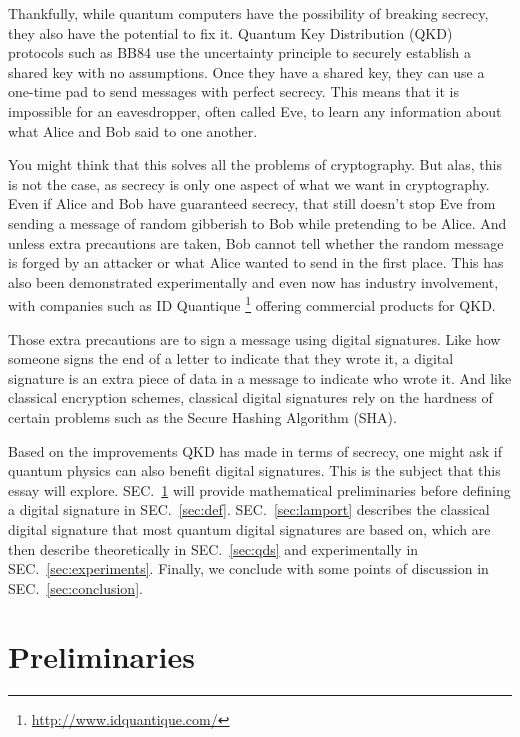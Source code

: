 \documentclass[%
 reprint,
 amsmath,amssymb,
 aps,
 pra,
]{revtex4-1}
\begin{document}
Thankfully, while quantum computers have the possibility of breaking secrecy, they also have the potential to fix it. Quantum Key Distribution (QKD) protocols such as BB84 \citep{BB84} use the uncertainty principle to securely establish a shared key with no assumptions. Once they have a shared key, they can use a one-time pad to send messages with perfect secrecy. This means that it is impossible for an eavesdropper, often called Eve, to learn any information about what Alice and Bob said to one another.

You might think that this solves all the problems of cryptography. But alas, this is not the case, as secrecy is only one aspect of what we want in cryptography. Even if Alice and Bob have guaranteed secrecy, that still doesn't stop Eve from sending a message of random gibberish to Bob while pretending to be Alice. And unless extra precautions are taken, Bob cannot tell whether the random message is forged by an attacker or what Alice wanted to send in the first place. This has also been demonstrated experimentally \cite{Bennett1992} and even now has industry involvement, with companies such as ID Quantique \footnote{\url{http://www.idquantique.com/}} offering commercial products for QKD.

Those extra precautions are to sign a message using digital signatures. Like how someone signs the end of a letter to indicate that they wrote it, a digital signature is an extra piece of data in a message to indicate who wrote it. And like classical encryption schemes, classical digital signatures rely on the hardness of certain problems such as the Secure Hashing Algorithm (SHA).

Based on the improvements QKD has made in terms of secrecy, one might ask if quantum physics can also benefit digital signatures. This is the subject that this essay will explore. SEC.\ \ref{sec:prelim} will provide mathematical preliminaries before defining a digital signature in SEC.\ \ref{sec:def}. SEC.\ \ref{sec:lamport} describes the classical digital signature that most quantum digital signatures are based on, which are then describe theoretically in SEC.\ \ref{sec:qds} and experimentally in SEC.\ \ref{sec:experiments}. Finally, we conclude with some points of discussion in SEC.\ \ref{sec:conclusion}.

\section{Preliminaries}
\label{sec:prelim}
\end{document}
